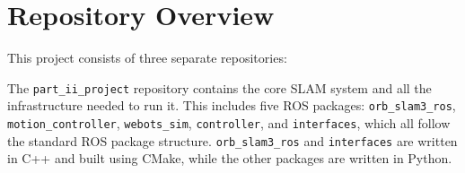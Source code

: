 \newpage
\section{Repository Overview}
\label{sec:repository-overview}

This project consists of three separate repositories:

\newcommand{\locindent}{3.3em}
\newcommand{\locsmallindent}{2em}
\newcommand{\locdiff}[3]{
    \makebox[#3][r]{\textcolor{PineGreen}{\texttt{+#1}}}
    \makebox[#3][r]{\textcolor{BrickRed}{\texttt{-#2}}}
}
\newcommand{\locadd}[2]{
    \makebox[#2][r]{\textcolor{PineGreen}{\texttt{+#1}}}
    \makebox[#2][r]{}
}
\newcommand{\locaddnospace}[2]{
    \makebox[#2][r]{\textcolor{PineGreen}{\texttt{+#1}}}
}
\newcommand{\locdoublespace}[1]{
    \makebox[#1][r]{}
    \makebox[#1][r]{}
}
\newcommand{\locsinglespace}[1]{
    \makebox[#1][r]{}
}

The \texttt{part\_ii\_project} repository contains the core SLAM system and all the infrastructure needed to run it. This includes five ROS packages: \texttt{orb\_slam3\_ros}, \texttt{motion\_controller}, \texttt{webots\_sim}, \texttt{controller}, and \texttt{interfaces}, which all follow the standard ROS package structure. \texttt{orb\_slam3\_ros} and \texttt{interfaces} are written in C++ and built using CMake, while the other packages are written in Python.

